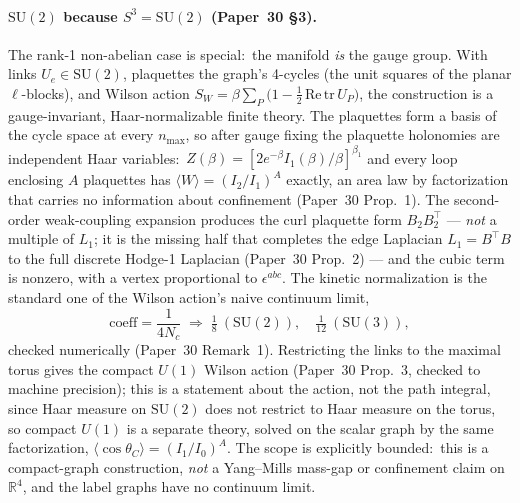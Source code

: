\documentclass[aps,pra,twocolumn,superscriptaddress,longbibliography]{revtex4-2}
\begin{document}
\paragraph{$\mathrm{SU}(2)$ because $S^3=\mathrm{SU}(2)$ (Paper~30 \S3).}
The rank-1 non-abelian case is special:\ the manifold \emph{is} the gauge
group.  With links $U_e\in\mathrm{SU}(2)$, plaquettes the graph's
4-cycles (the unit squares of the planar $\ell$-blocks), and Wilson action
$S_W=\beta\sum_P\bigl(1-\tfrac12\,\mathrm{Re}\,\mathrm{tr}\,U_P\bigr)$,
the construction is a gauge-invariant, Haar-normalizable finite theory.
The plaquettes form a basis of the cycle space at every $n_{\max}$, so after
gauge fixing the plaquette holonomies are independent Haar variables:\
$Z(\beta)=[2e^{-\beta}I_1(\beta)/\beta]^{\beta_1}$ and every loop enclosing
$A$ plaquettes has $\langle W\rangle = (I_2/I_1)^{A}$ exactly, an area law
by factorization that carries no information about confinement
(Paper~30 Prop.~1).  The second-order weak-coupling expansion produces
the curl plaquette form $B_2B_2^{\top}$ --- \emph{not} a
multiple of $L_1$; it is the missing half that completes the edge
Laplacian $L_1=B^{\top}B$ to the full discrete Hodge-1 Laplacian (Paper~30
Prop.~2) --- and the cubic term is nonzero, with a vertex proportional to
$\epsilon^{abc}$.  The kinetic normalization is the standard one of the
Wilson action's naive continuum limit,
\begin{equation}
\text{coeff} = \frac{1}{4N_c}
\;\Longrightarrow\;
\tfrac18\ (\mathrm{SU}(2)),\quad
\tfrac1{12}\ (\mathrm{SU}(3)),
\end{equation}
checked numerically (Paper~30 Remark~1).  Restricting the links to the
maximal torus gives the compact $U(1)$ Wilson action (Paper~30 Prop.~3,
checked to machine precision); this is a statement about the action, not
the path integral, since Haar measure on $\mathrm{SU}(2)$ does not restrict
to Haar measure on the torus, so compact $U(1)$ is a separate theory, solved
on the scalar graph by the same factorization,
$\langle\cos\theta_C\rangle=(I_1/I_0)^{A}$.  The scope is explicitly
bounded:\ this is a compact-graph construction, \emph{not} a Yang--Mills
mass-gap or confinement claim on $\mathbb{R}^4$, and the label graphs have
no continuum limit.
\end{document}
